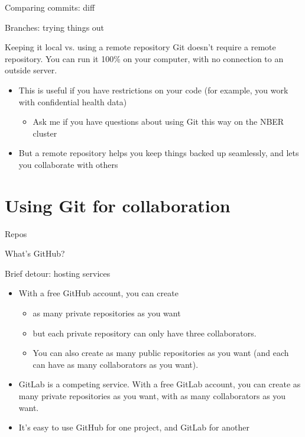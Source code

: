 \documentclass{beamer}
\begin{document}
\begin{frame}{Comparing commits: diff}
\end{frame}


\begin{frame}{Branches: trying things out}
\end{frame}

\begin{frame}{Keeping it local vs. using a remote repository}
Git doesn't require a remote repository. You can run it 100\% on your computer, with no connection to an outside server.
\begin{itemize}
\item This is useful if you have restrictions on your code (for example, you work with confidential health data)
\begin{itemize}
\item Ask me if you have questions about using Git this way on the NBER cluster
\end{itemize}
\item But a remote repository helps you keep things backed up seamlessly, and lets you collaborate with others
\end{itemize}

\end{frame}

\section{Using Git for collaboration}

\begin{frame}{Repos}
\end{frame}

\begin{frame}{What's GitHub?}
\end{frame}

\begin{frame}{Brief detour: hosting services}
\begin{itemize}
\item With a free GitHub account, you can create
\begin{itemize}
\item as many private repositories as you want
\item but each private repository can only have three collaborators.
\item You can also create as many public repositories as you want (and each can have as many collaborators as you want).
\end{itemize}
\item GitLab is a competing service. With a free GitLab account, you can create as many private repositories as you want, with as many collaborators as you want.
\item It's easy to use GitHub for one project, and GitLab for another
\end{itemize}

\end{frame}
\end{document}
